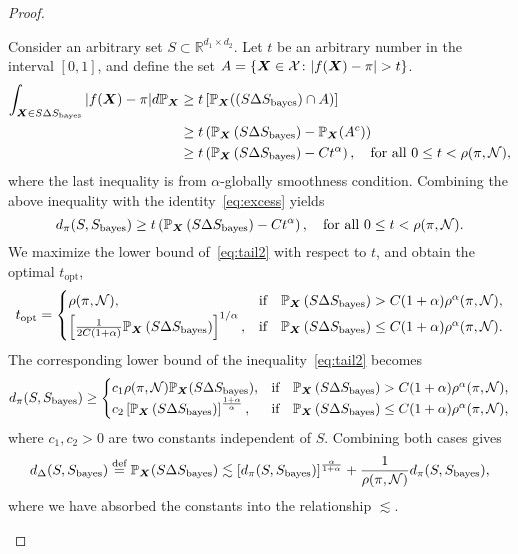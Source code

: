 \documentclass[11pt]{article}
\theoremstyle{plain}
\theoremstyle{definition}
\def\bayesS{S_{\textup{bayes}}}
\begin{document}
\begin{proof}
\begin{enumerate}[label={2.\arabic*},wide, labelwidth=!, labelindent=0pt]
Consider an arbitrary set $S\subset\mathbb{R}^{d_1\times d_2}$. Let $t$ be an arbitrary number in the interval $[0,1]$, and define the set $A=\{\mX\in \tX \colon |f(\mX)-\pi|>t\}$. 
\begin{align}
\int_{\bm X\in S\Delta S_{\text{bayes}}}|f(\bm X)-\pi|d \mathbb{P}_{\bm X} &\geq t \left[\mathbb{P}_{\bm X}(\left(S\Delta S_{\text{bayes}}) \cap A\right)\right] \\
&\geq t\left( \mathbb{P}_{\bm X}\left(S\Delta S_{\text{bayes}}\right) - \mathbb{P}_{\bm X}(A^c)\right)\\
&\geq t\left( \mathbb{P}_{\bm X}\left(S\Delta S_{\text{bayes}}\right) - Ct^{\alpha}\right),\quad \text{for all }0\leq t < \rho(\pi,\mathcal{N}),
\end{align}
where the last inequality is from $\alpha$-globally smoothness condition.
Combining the above inequality with the identity~\eqref{eq:excess} yields
\begin{equation}\label{eq:tail2}
d_\pi(S,\bayesS)\geq t\left( \mathbb{P}_{\mX}\left(S\Delta S_{\text{bayes}}\right) - Ct^{\alpha}\right),\quad \text{for all }0\leq t < \rho(\pi,\tN).
\end{equation}
We maximize the lower bound of~\eqref{eq:tail2} with respect to $t$, and obtain the optimal $t_{\text{opt}}$,
\[
t_{\text{opt}}=\begin{cases}
\rho(\pi,\mathcal{N}), & \text{if}\quad \mathbb{P}_{\bm X}\left(S\Delta S_{\text{bayes}}\right)> C(1+\alpha)\rho^\alpha(\pi,\mathcal{N}),\\
\left[{1\over 2C(1+\alpha)}\mathbb{P}_{\bm X}\left(S\Delta S_{\text{bayes}}\right)\right]^{1 / \alpha}, & \text{if}\quad \mathbb{P}_{\bm X}\left(S\Delta S_{\text{bayes}}\right)\leq C(1+\alpha) \rho^\alpha(\pi,\mathcal{N}).
\end{cases}
\]
The corresponding lower bound of the inequality~\eqref{eq:tail2} becomes
\begin{align}
  d_\pi(S,\bayesS)\geq\begin{cases}
c_1\rho(\pi,\tN)\mathbb{P}_{\mX}(S\Delta \bayesS), & \text{if}\quad \mathbb{P}_{\mX}\left(S\Delta S_{\text{bayes}}\right)> C(1+\alpha)\rho^\alpha(\pi,\tN),\\
c_2 \left[\mathbb{P}_{\mX}\left(S\Delta S_{\text{bayes}}\right)\right]^{1+\alpha \over \alpha}, & \text{if}\quad \mathbb{P}_{\mX}\left(S\Delta S_{\text{bayes}}\right)\leq C(1+\alpha) \rho^\alpha(\pi,\tN),
\end{cases}
\end{align}
where $c_1,c_2>0$ are two constants independent of $S$. Combining both cases gives
\begin{align}\label{eq:cmultiidentity}
    d_\Delta(S,\bayesS) \stackrel{\text{def}}{=}\mathbb{P}_{\mX}(S\Delta\bayesS)\lesssim \left[d_\pi(S,\bayesS)\right]^{\alpha \over 1+\alpha}+\frac{1}{\rho(\pi,\tN)}d_\pi(S,\bayesS),
\end{align}
where we have absorbed the constants into the relationship $\lesssim$. 


\end{enumerate}
\end{proof}
\end{document}
